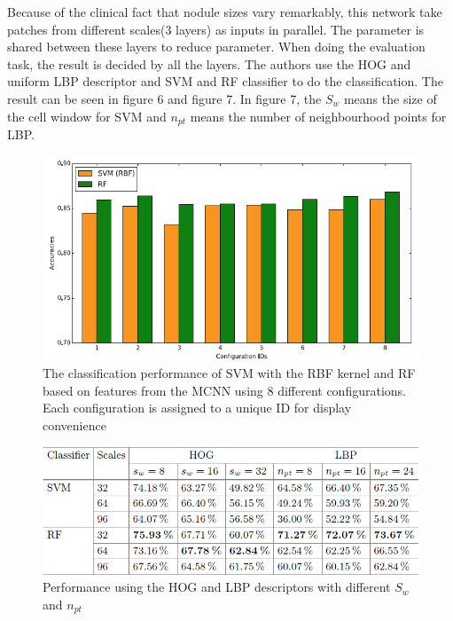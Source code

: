 \documentclass[10pt,twocolumn,letterpaper]{article}
\begin{document}
Because of the clinical fact that nodule sizes vary remarkably, this network take patches from different scales(3 layers) as inputs in parallel. The parameter is shared between these layers to reduce parameter. When doing the evaluation task, the result is decided by all the layers. The authors use the HOG and uniform LBP descriptor and SVM and RF classifier to do the classification. The result can be seen in figure 6 and figure 7. In figure 7, the \textit{$S_w$} means the size of the cell window for SVM and \textit{$n_{pt}$} means the number of neighbourhood points for LBP.

\begin{figure}[t]
	\begin{center}
		\includegraphics[width=0.8\linewidth]{Pic/9.png}
	\end{center}
	\caption{The classification performance of SVM with the RBF kernel and RF based on features from the MCNN using 8 different configurations. Each configuration is assigned to a unique ID for display convenience}
	\label{fig:long}
	\label{fig:onecol}
\end{figure}

\begin{figure}[t]
	\begin{center}
		\includegraphics[width=0.8\linewidth]{Pic/10.png}
	\end{center}
	\caption{Performance using the HOG and LBP descriptors with different \textit{$S_w$} and \textit{$n_{pt}$}}
	\label{fig:long}
	\label{fig:onecol}
\end{figure}
\end{document}

